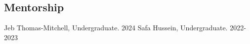 \subsection{Mentorship}

Jeb Thomas-Mitchell, Undergraduate. \hfill 2024
Safa Hussein, Undergraduate. \hfill 2022-2023